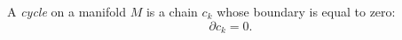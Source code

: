 A \textit{cycle} on a manifold $M$ is a chain $c_k$ whose boundary is equal to zero:
$$\partial c_k = 0.$$
